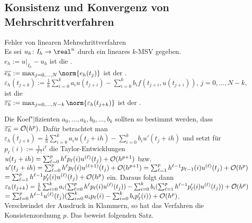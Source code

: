\subsection{%
    Konsistenz und Konvergenz von Mehrschrittverfahren%
}

\begin{Def}{Fehler von linearen Mehrschrittverfahren}\\
    Es sei $u_h\colon I_h \rightarrow \real^n$ durch ein lineares
    $k$-MSV gegeben.\\
    $e_h := u|_{I_h} - u_h$ ist die .\\
    $\overline{e_h} := \max_{j=0,\dotsc,N} \norm{e_h(t_j)}$ ist der
    .\\
    $\varepsilon_h(t_{j+k}) := \frac{1}{h} \sum_{i=0}^k a_i u(t_{j+i}) -
    \sum_{i=0}^k b_i f(t_{j+i}, u(t_{j+i}))$, $j = 0, \dotsc, N - k,$
    ist die \\
    $\overline{\varepsilon_h} :=
    \max_{j=0,\dotsc,N-k} \norm{\varepsilon_h(t_{j+k})}$ ist der
    .
\end{Def}

\begin{Bem}
    Die Koef"|fizienten $a_0, \dotsc, a_k, b_0, \dotsc, b_k$ sollten so
    bestimmt werden, dass\\
    $\overline{\varepsilon_h} = \mathcal{O}(h^p)$.
    Dafür betrachtet man $\varepsilon_h(t_{j+k}) =
    \frac{1}{h} \sum_{i=0}^k a_i u(t_j + ih) - \sum_{i=0}^k b_i u'(t_j + ih)$
    und setzt für $p_\ell(i) := \frac{1}{\ell!} i^\ell$
    die Taylor-Entwicklungen
    $u(t_j + ih) = \sum_{\ell=0}^p h^\ell p_\ell(i) u^{(\ell)}(t_j) +
    \mathcal{O}(h^{p+1})$ bzw.\\
    $u'(t_j + ih) = \sum_{\ell=0}^p h^\ell p_\ell(i) u^{(\ell+1)}(t_j) +
    \mathcal{O}(h^{p+1}) =
    \sum_{\ell=1}^p h^{\ell-1} p_{\ell-1}(i) u^{(\ell)}(t_j) + \mathcal{O}(h^p)$\\
    $= \sum_{\ell=1}^p h^{\ell-1} p_\ell'(i) u^{(\ell)}(t_j) + \mathcal{O}(h^p)$
    ein.
    Daraus folgt dann\\
    $\varepsilon_h(t_{j+k}) =
    \frac{1}{h} \sum_{i=0}^k a_i
    (\sum_{\ell=0}^p h^\ell p_\ell(i) u^{(\ell)}(t_j)) -
    \sum_{i=0}^k b_i
    (\sum_{\ell=1}^p h^{\ell-1} p_\ell'(i) u^{(\ell)}(t_j)) + \mathcal{O}(h^p)$\\
    $= \sum_{\ell=0}^p h^{\ell-1} u^{(\ell)}(t_j)
    (\sum_{i=0}^k a_i p_\ell(i) - \sum_{i=0}^k b_i p_\ell'(i)) + \mathcal{O}(h^p)$.\\
    Verschwindet der Ausdruck in Klammern, so hat das Verfahren die
    Konsistenzordnung $p$.
    Das beweist folgenden Satz.
\end{Bem}

